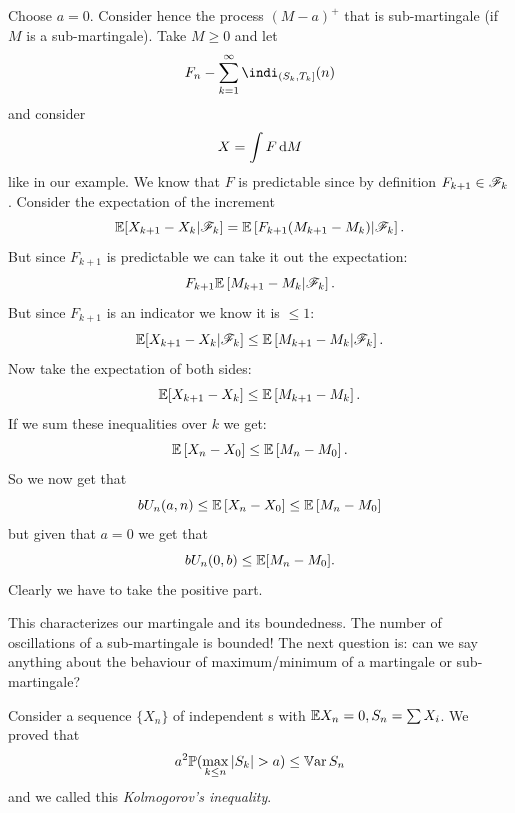 \documentclass{report}
\begin{document}
\begin{fancyproof}
	Choose $a=0$. Consider hence the process $(M-a)^{+}$ that is sub-martingale (if $M$ is a sub-martingale). Take $M\geq 0$ and let 
	\begin{equation*}
		F_{n}-\sum_{k=1}^{\infty}\indi_{(S_{k},T_{k}]}(n)
	\end{equation*}
	and consider 
	\begin{equation*}
		X=\int F\mathop{}\!\mathrm{d} M
	\end{equation*}
	like in our example. We know that $F$ is predictable since by definition $F_{k+1}\in\mathscr{F}_{k}$. Consider the expectation of the increment
	\begin{equation*}
		\mathbb{E}[X_{k+1}-X_{k}|\mathscr{F}_{k}]=\mathbb{E}\left[F_{k+1}(M_{k+1}-M_{k})|\mathscr{F}_{k}\right].
	\end{equation*}
	But since $F_{k+1}$ is predictable we can take it out the expectation:
	\begin{equation*}
		F_{k+1}\mathbb{E}\left[M_{k+1}-M_{k}|\mathscr{F}_{k}\right].
	\end{equation*}
	But since $F_{k+1}$ is an indicator we know it is $\leq1$:
	\begin{equation*}
		\mathbb{E}[X_{k+1}-X_{k}|\mathscr{F}_{k}]\leq\mathbb{E}\left[M_{k+1}-M_{k}|\mathscr{F}_{k}\right].
	\end{equation*}
	Now take the expectation of both sides:
	\begin{equation*}
		\mathbb{E}[X_{k+1}-X_{k}]\leq\mathbb{E}\left[M_{k+1}-M_{k}\right].
	\end{equation*}
	If we sum these inequalities over $k$ we get:
	\begin{equation*}
		\mathbb{E}\left[X_{n}-X_{0}\right]\leq\mathbb{E}\left[M_{n}-M_{0}\right].
	\end{equation*}
	So we now get that
	\begin{equation*}
		bU_{n}(a,n)\leq\mathbb{E}\left[X_{n}-X_{0}\right]\leq\mathbb{E}\left[M_{n}-M_{0}\right]
	\end{equation*}
	but given that $a=0$ we get that
	\begin{equation*}
		bU_{n}(0,b)\leq\mathbb{E}[M_{n}-M_{0}].
	\end{equation*}
	Clearly we have to take the positive part.
\end{fancyproof}
This characterizes our martingale and its boundedness. The number of oscillations of a sub-martingale is bounded! The next question is: can we say anything about the behaviour of maximum/minimum of a martingale or sub-martingale? 
\begin{remark}
	Consider a sequence $\{X_{n}\}$ of independent \rv s with $\mathbb{E} X_{n}=0,S_n=\sum X_{i}$. We proved that
	\begin{equation*}
		a^{2}\pr(\max_{k\leq n}|S_{k}|>a)\leq\var S_{n}
	\end{equation*}
	and we called this \emph{Kolmogorov's inequality}.
\end{remark}
\end{document}

